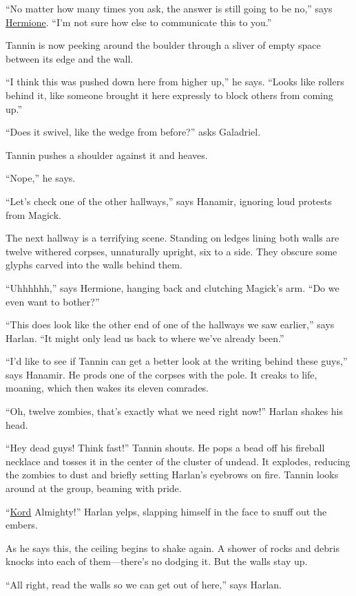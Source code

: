 \documentclass[smalldemyvopaper,11pt,twoside,onecolumn,openright,extrafontsizes]{memoir}
\begin{document}
``No matter how many times you ask, the answer is still going to be
no,'' says \href{/characters/hermione/}{Hermione}. ``I'm not sure how
else to communicate this to you.''

Tannin is now peeking around the boulder through a sliver of empty space
between its edge and the wall.

``I think this was pushed down here from higher up,'' he says. ``Looks
like rollers behind it, like someone brought it here expressly to block
others from coming up.''

``Does it swivel, like the wedge from before?'' asks Galadriel.

Tannin pushes a shoulder against it and heaves.

``Nope,'' he says.

``Let's check one of the other hallways,'' says Hanamir, ignoring loud
protests from Magick.

The next hallway is a terrifying scene. Standing on ledges lining both
walls are twelve withered corpses, unnaturally upright, six to a side.
They obscure some glyphs carved into the walls behind them.

``Uhhhhhh,'' says Hermione, hanging back and clutching Magick's arm.
``Do we even want to bother?''

``This does look like the other end of one of the hallways we saw
earlier,'' says Harlan. ``It might only lead us back to where we've
already been.''

``I'd like to see if Tannin can get a better look at the writing behind
these guys,'' says Hanamir. He prods one of the corpses with the pole.
It creaks to life, moaning, which then wakes its eleven comrades.

``Oh, twelve zombies, that's exactly what we need right now!'' Harlan
shakes his head.

``Hey dead guys! Think fast!'' Tannin shouts. He pops a bead off his
fireball necklace and tosses it in the center of the cluster of undead.
It explodes, reducing the zombies to dust and briefly setting Harlan's
eyebrows on fire. Tannin looks around at the group, beaming with pride.

``\href{/characters/kord/}{Kord} Almighty!'' Harlan yelps, slapping
himself in the face to snuff out the embers.

As he says this, the ceiling begins to shake again. A shower of rocks
and debris knocks into each of them---there's no dodging it. But the
walls stay up.

``All right, read the walls so we can get out of here,'' says Harlan.
\end{document}
